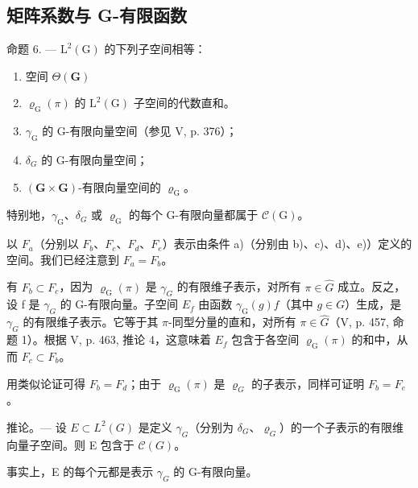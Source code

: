 \subsection{矩阵系数与 G-有限函数}

命题 6. --- \(\mathrm{L}^{2}(\mathrm{G})\) 的下列子空间相等：

\begin{enumerate}
\def\labelenumi{\alph{enumi})}
\item
  空间 \(\Theta (\mathbf{G})\)
\item
  \(\varrho_{\mathrm{G}}(\pi)\) 的 \(\mathrm{L}^2 (\mathrm{G})\) 子空间的代数直和。
\item
  \(\gamma_{\mathrm{G}}\) 的 G-有限向量空间（参见 V, p. 376）；
\item
  \(\delta_{G}\) 的 G-有限向量空间；
\item
  \((\mathbf{G} \times \mathbf{G})\)-有限向量空间的 \(\varrho_{\mathrm{G}}\)。
\end{enumerate}

特别地，\(\gamma_{\mathrm{G}}\)、\(\delta_{G}\) 或 \(\varrho_{\mathrm{G}}\) 的每个 G-有限向量都属于 \(\mathcal{C}(\mathrm{G})\)。

以 \(F_{a}\)（分别以 \(F_{b}\)、\(F_{c}\)、\(F_{d}\)、\(F_{e}\)）表示由条件 a)（分别由 b)、c)、d)、e)）定义的空间。我们已经注意到 \(F_{a} = F_{b}\)。

有 \(F_{b} \subset F_{c}\)，因为 \(\varrho_{\mathrm{G}}(\pi)\) 是 \(\gamma_{G}\) 的有限维子表示，对所有 \(\pi \in \widehat{G}\) 成立。反之，设 f 是 \(\gamma_{G}\) 的 G-有限向量。子空间 \(E_{f}\) 由函数 \(\gamma_{\mathrm{G}}(g)f\)（其中 \(g \in G\)）生成，是 \(\gamma_{G}\) 的有限维子表示。它等于其 \(\pi\)-同型分量的直和，对所有 \(\pi \in \widehat{G}\)（V, p. 457, 命题 1）。根据 V, p. 463, 推论 4，这意味着 \(E_{f}\) 包含于各空间 \(\varrho_{\mathrm{G}}(\pi)\) 的和中，从而 \(F_{c} \subset F_{b}\)。

用类似论证可得 \(F_{b} = F_{d}\)；由于 \(\varrho_{\mathrm{G}}(\pi)\) 是 \(\varrho_{G}\) 的子表示，同样可证明 \(F_{b} = F_{e}\)。

推论。--- 设 \(E \subset L^{2}(G)\) 是定义 \(\gamma_{G}\)（分别为 \(\delta_{G}\)、\(\varrho_{G}\)）的一个子表示的有限维向量子空间。则 E 包含于 \(\mathcal{C}(G)\)。

事实上，E 的每个元都是表示 \(\gamma_{G}\) 的 G-有限向量。

